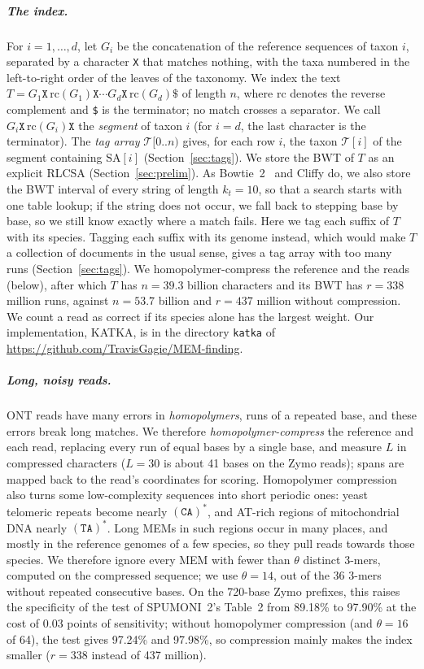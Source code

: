 \subparagraph*{The index.}
\label{sec:index}
For $i = 1, \ldots, d$, let $G_i$ be the concatenation of the reference sequences of taxon $i$, separated by a character \texttt{X} that matches nothing, with the taxa numbered in the left-to-right order of the leaves of the taxonomy.
We index the text $T = G_1 \mathtt{X}\, \mathrm{rc}(G_1) \mathtt{X} \cdots G_d \mathtt{X}\, \mathrm{rc}(G_d) \mathtt{\$}$ of length $n$, where $\mathrm{rc}$ denotes the reverse complement and \texttt{\$} is the terminator; no match crosses a separator.
We call $G_i \mathtt{X}\, \mathrm{rc}(G_i) \mathtt{X}$ the \emph{segment} of taxon $i$ (for $i = d$, the last character is the terminator).
The \emph{tag array} $\mathcal{T}[0..n)$ gives, for each row $i$, the taxon $\mathcal{T}[i]$ of the segment containing $\mathrm{SA}[i]$ (Section~\ref{sec:tags}).
We store the BWT of $T$ as an explicit RLCSA (Section~\ref{sec:prelim}).
As Bowtie~2~\cite{LS12} and Cliffy do, we also store the BWT interval of every string of length $k_t = 10$, so that a search starts with one table lookup; if the string does not occur, we fall back to stepping base by base, so we still know exactly where a match fails.
Here we tag each suffix of $T$ with its species.
Tagging each suffix with its genome instead, which would make $T$ a collection of documents in the usual sense, gives a tag array with too many runs (Section~\ref{sec:tags}).
We homopolymer-compress the reference and the reads (below), after which $T$ has $n = 39.3$ billion characters and its BWT has $r = 338$ million runs, against $n = 53.7$ billion and $r = 437$ million without compression.
We count a read as correct if its species alone has the largest weight.
Our implementation, KATKA, is in the directory \texttt{katka} of \url{https://github.com/TravisGagie/MEM-finding}.

\subparagraph*{Long, noisy reads.}
\label{sec:bml}
ONT reads have many errors in \emph{homopolymers}, runs of a repeated base, and these errors break long matches.
We therefore \emph{homopolymer-compress} the reference and each read, replacing every run of equal bases by a single base, and measure $L$ in compressed characters ($L = 30$ is about 41 bases on the Zymo reads); spans are mapped back to the read's coordinates for scoring.
Homopolymer compression also turns some low-complexity sequences into short periodic ones: yeast telomeric repeats become nearly $(\mathtt{CA})^*$, and AT-rich regions of mitochondrial DNA nearly $(\mathtt{TA})^*$.
Long MEMs in such regions occur in many places, and mostly in the reference genomes of a few species, so they pull reads towards those species.
We therefore ignore every MEM with fewer than $\theta$ distinct 3-mers, computed on the compressed sequence; we use $\theta = 14$, out of the 36 3-mers without repeated consecutive bases.
On the 720-base Zymo prefixes, this raises the specificity of the test of SPUMONI~2's Table~2 from 89.18\% to 97.90\% at the cost of 0.03 points of sensitivity; without homopolymer compression (and $\theta = 16$ of 64), the test gives 97.24\% and 97.98\%, so compression mainly makes the index smaller ($r = 338$ instead of 437 million).

